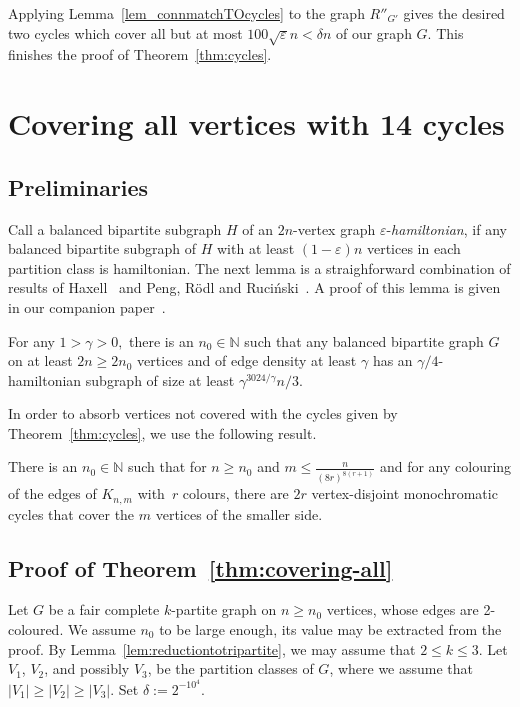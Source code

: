 \documentclass[a4paper,10pt]{article}
\let\eps\varepsilon
\begin{document}
Applying Lemma~\ref{lem_connmatchTOcycles} to the graph $R''_{G'}$
gives the desired two cycles which cover all but at most $100\sqrt\eps n < \delta n$ of our graph $G$. This finishes the proof of Theorem~\ref{thm:cycles}.

\section{Covering all vertices with 14 cycles}\label{sec:exact-cycles}

\subsection{Preliminaries}

Call a balanced bipartite subgraph $H$ of an $2n$-vertex graph $\eps$-\emph{hamiltonian}, if any balanced bipartite subgraph of $H$ with at least
$(1-\eps) n$ vertices in each partition class is hamiltonian. The next lemma is a straighforward combination of results of Haxell~\cite{Hax97} and Peng, R\"odl and Ruci\'nski~\cite{PRR02}.
A proof of this lemma is given in our companion paper~\cite{LSS14}.

\begin{lemma}\cite{LSS14}
\label{lem:eps-hamiltonian}
For any $1 >\gamma > 0,$ there is an $n_0 \in
\mathbb{N}$ such that any
balanced bipartite graph $G$ on at least $2n \geq 2n_0$ vertices and of
edge density at least $\gamma$ has an $\gamma/4$-hamiltonian subgraph
of size at least $\gamma^{3024/\gamma} n/3$.
\end{lemma}

In order to absorb vertices not covered with the cycles given by Theorem~\ref{thm:cycles}, we use the following result.

\begin{lemma}
\label{lem:somewhat-unbalanced}
There is an $n_0 \in \mathbb N$ such that for $n\geq n_0$ and $m \leq \frac{n}{(8r)^{8(r+1)}}$ and for any 
colouring of the edges of $K_{n,m}$ with~$r$ colours, there are $2r$ vertex-disjoint monochromatic cycles that cover the $m$ vertices of the smaller side.
\end{lemma}

\subsection{Proof of Theorem~\ref{thm:covering-all}}

Let $G$ be a fair complete $k$-partite graph on $n\geq n_0$ vertices, whose edges are 2-coloured. We assume $n_0$ to be large enough, its value may be extracted from the proof.
By Lemma~\ref{lem:reductiontotripartite}, we may assume that $2 \le k \le 3$.
Let $V_1$, $V_2$, and possibly $V_3$, be the partition classes of $G$, where we assume that $|V_1|\ge|V_2|\ge|V_3|$.
Set $\delta := 2^{-10^4}$.
\end{document}
